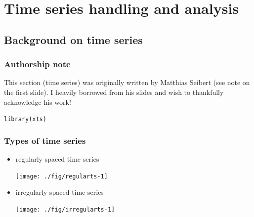\documentclass[xcolor=table, xcolor=dvipsnames]{beamer}\usepackage[]{graphicx}\usepackage[]{color}
\makeatletter
\newcommand{\hlstd}[1]{\textcolor[rgb]{0,0,0}{#1}}
\newcommand{\hlkwd}[1]{\textcolor[rgb]{0,0,1}{#1}}
\newenvironment{kframe}{%
 \def\at@end@of@kframe{}%
 \ifinner\ifhmode%
  \def\at@end@of@kframe{\end{minipage}}%
  \begin{minipage}{\columnwidth}%
 \fi\fi%
 \def\FrameCommand##1{\hskip\@totalleftmargin \hskip-\fboxsep
 \colorbox{shadecolor}{##1}\hskip-\fboxsep
     \hskip-\linewidth \hskip-\@totalleftmargin \hskip\columnwidth}%
 \MakeFramed {\advance\hsize-\width
   \@totalleftmargin\z@ \linewidth\hsize
   \@setminipage}}%
 {\par\unskip\endMakeFramed%
 \at@end@of@kframe}
\newenvironment{knitrout}{}{} %
\makeatother
\begin{document}
\section{Time series handling and analysis}

\subsection{Background on time series}

\begin{frame}\frametitle{Authorship note} 
This section (time series) was originally written by Matthias Seibert (see note on the first slide). I heavily borrowed from his slides and wish to thankfully acknowledge his work!

\begin{knitrout}
\color{fgcolor}\begin{kframe}
\begin{alltt}
\hlkwd{library}\hlstd{(xts)}
\end{alltt}
\end{kframe}
\end{knitrout}
\end{frame}


\begin{frame}\frametitle{Types of time series}
\begin{itemize}
\item regularly spaced time series
\begin{knitrout}
\color{fgcolor}

{\centering \texttt{[image: ./fig/regularts-1]} 

}



\end{knitrout}
\item irregularly spaced time series
\begin{knitrout}
\color{fgcolor}

{\centering \texttt{[image: ./fig/irregularts-1]} 

}



\end{knitrout}
\end{itemize}
\end{frame}
\end{document}
